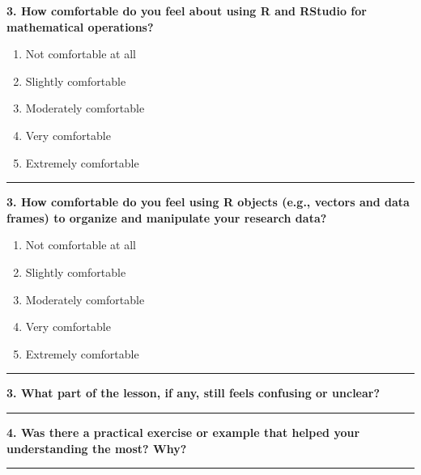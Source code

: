 \documentclass[
  letterpaper,
  DIV=11,
  numbers=noendperiod]{scrartcl}
\providecommand{\tightlist}{%
  \setlength{\itemsep}{0pt}\setlength{\parskip}{0pt}}
\begin{document}
\textbf{3. How comfortable do you feel about using R and RStudio for
mathematical operations?}

\begin{enumerate}
\def\labelenumi{\alph{enumi}.}
\tightlist
\item
  Not comfortable at all\\
\item
  Slightly comfortable\\
\item
  Moderately comfortable\\
\item
  Very comfortable\\
\item
  Extremely comfortable
\end{enumerate}

\begin{center}\rule{0.5\linewidth}{0.5pt}\end{center}

\textbf{3. How comfortable do you feel using R objects (e.g., vectors
and data frames) to organize and manipulate your research data?}

\begin{enumerate}
\def\labelenumi{\alph{enumi}.}
\tightlist
\item
  Not comfortable at all\\
\item
  Slightly comfortable\\
\item
  Moderately comfortable\\
\item
  Very comfortable\\
\item
  Extremely comfortable
\end{enumerate}

\begin{center}\rule{0.5\linewidth}{0.5pt}\end{center}

\textbf{3. What part of the lesson, if any, still feels confusing or
unclear?}

\begin{center}\rule{0.5\linewidth}{0.5pt}\end{center}

\textbf{4. Was there a practical exercise or example that helped your
understanding the most? Why?}

\begin{center}\rule{0.5\linewidth}{0.5pt}\end{center}
\end{document}
